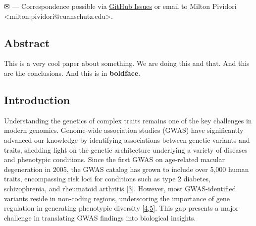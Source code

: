 \leavevmode{}%
✉ --- Correspondence possible via \href{https://github.com/pivlab/annual_review_of_biomedical_data_science/issues}{GitHub Issues}
or email to
Milton Pividori \textless milton.pividori@cuanschutz.edu\textgreater.

\hypertarget{abstract}{%
\subsection{Abstract}\label{abstract}}

This is a very cool paper about something.
We are doing this and that.
And this are the conclusions.
And this is in \textbf{boldface}.

\hypertarget{introduction}{%
\subsection{Introduction}\label{introduction}}

Understanding the genetics of complex traits remains one of the key challenges in modern genomics.
Genome-wide association studies (GWAS) have significantly advanced our knowledge by identifying associations between genetic variants and traits, shedding light on the genetic architecture underlying a variety of diseases and phenotypic conditions.
Since the first GWAS on age-related macular degeneration in 2005, the GWAS catalog has grown to include over 5,000 human traits, encompassing risk loci for conditions such as type 2 diabetes, schizophrenia, and rheumatoid arthritis {[}\protect\hyperlink{ref-HicyXvA4}{3}{]}.
However, most GWAS-identified variants reside in non-coding regions, underscoring the importance of gene regulation in generating phenotypic diversity {[}\protect\hyperlink{ref-BqjxxhyF}{4},\protect\hyperlink{ref-9Pr9idng}{5}{]}.
This gap presents a major challenge in translating GWAS findings into biological insights.

